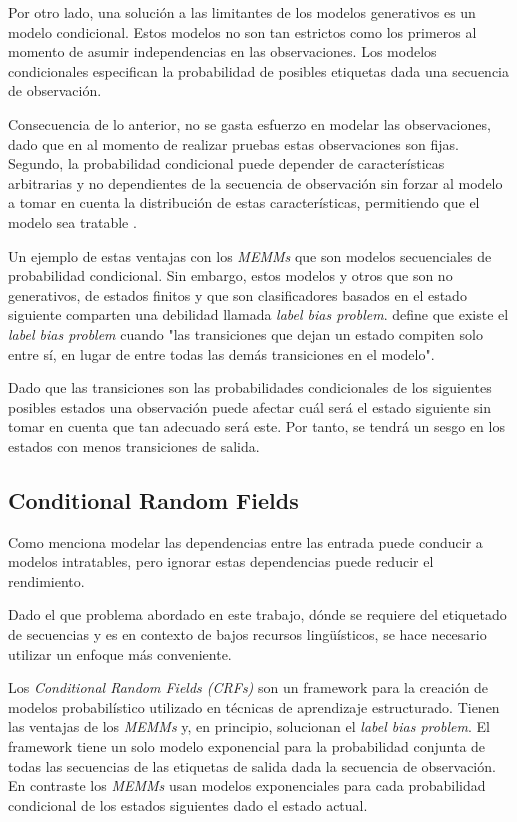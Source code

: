 \documentclass[letterpaper,12pt,oneside]{book}
\theoremstyle{definition}
\begin{document}
	
	Por otro lado, una solución a las limitantes de los modelos generativos es un modelo condicional. Estos modelos no son tan estrictos como los primeros al momento de asumir independencias en las observaciones. Los modelos condicionales especifican la probabilidad de posibles etiquetas dada una secuencia de observación.

	
	Consecuencia de lo anterior, no se gasta esfuerzo en modelar las observaciones, dado que en al momento de realizar pruebas estas observaciones son fijas. Segundo, la probabilidad condicional puede depender de características arbitrarias y no dependientes de la secuencia de observación sin forzar al modelo a tomar en cuenta la distribución de estas características, permitiendo que el modelo sea tratable \citep{lafferty2001conditional}.

	
	Un ejemplo de estas ventajas con los \textit{MEMMs} que son modelos secuenciales de probabilidad condicional. Sin embargo, estos modelos y otros que son no generativos, de estados finitos y que son clasificadores basados en el estado siguiente comparten una debilidad llamada \emph{label bias problem}. \citet{lafferty2001conditional} define que existe el \emph{label bias problem} cuando "las transiciones que dejan un estado compiten solo entre sí, en lugar de entre todas las demás transiciones en el modelo".

	
	Dado que las transiciones son las probabilidades condicionales de los siguientes posibles estados una observación puede afectar cuál será el estado siguiente sin tomar en cuenta que tan adecuado será este. Por tanto, se tendrá un sesgo en los estados con menos transiciones de salida.

	
	\subsection{Conditional Random Fields}

	
	Como menciona \citet{sutton2012introduction} modelar las dependencias entre las entrada puede conducir a modelos intratables, pero ignorar estas dependencias puede reducir el rendimiento.

	
	Dado el que problema abordado en este trabajo, dónde se requiere del etiquetado de secuencias y es en contexto de bajos recursos lingüísticos, se hace necesario utilizar un enfoque más conveniente.

	
	Los \textit{Conditional Random Fields (CRFs)} son un framework para la creación de modelos probabilístico utilizado en técnicas de aprendizaje estructurado. Tienen las ventajas de los \textit{MEMMs} y, en principio, solucionan el \emph{label bias problem}. El framework tiene un solo modelo exponencial para la probabilidad conjunta de todas las secuencias de las etiquetas de salida dada la secuencia de observación. En contraste los \emph{MEMMs} usan modelos exponenciales para cada probabilidad condicional de los estados siguientes dado el estado actual.
\end{document}
